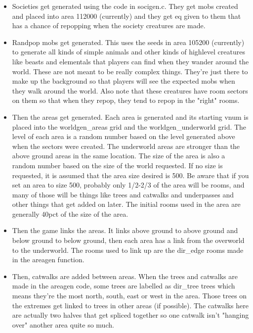 \begin{itemize}

\item Societies get generated using the code in socigen.c. They get
mobs created and placed into area 112000 (currently) and they get
eq given to them that has a chance of repopping when the society
creatures are made.


\item Randpop mobs get generated. This uses the seeds in area 105200
(currently) to generate all kinds of simple animals and other kinds
of highlevel creatures like beasts and elementals that players can find
when they wander around the world. These are not meant to be really
complex things. They're just there to make up the background so that
players will see the expected mobs when they walk around the world.
Also note that these creatures have room sectors on them so that 
when they repop, they tend to repop in the "right" rooms.



\item Then the areas get generated. Each area is generated and its
starting vnum is placed into the worldgen\_areas grid and the
worldgen\_underworld grid. The level of each area is a random number
based on the level generated above when the sectors were created.
The underworld areas are stronger than the above ground areas in
the same location. The size of the area is also a random number based
on the size of the world requested. If no size is requested, it is
assumed that the area size desired is 500. Be aware that if you set
an area to size 500, probably only 1/2-2/3 of the area will be
rooms, and many of those will be things like trees and catwalks and
underpasses and other things that get added on later. The initial
rooms used in the area are generally 40pct of the size of the area.

\item Then the game links the areas. It links above ground to 
above ground and below ground to below ground, then each area has
a link from the overworld to the underworld. The rooms used to link
up are the dir\_edge rooms made in the areagen function. 


\item Then, catwalks are added between areas. When the trees and
catwalks are made in the areagen code, some trees are labelled as
dir\_tree trees which means they're the most north, south, east
or west in the area. Those trees on the extremes get linked to trees
in other areas (if possible). The catwalks here are actually two halves
that get spliced together so one catwalk isn't "hanging over" another
area quite so much.


\end{itemize}
